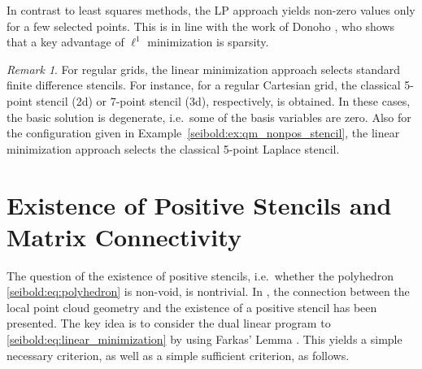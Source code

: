 \documentclass[reqno]{amsart}
\theoremstyle{plain}
\theoremstyle{definition}
\theoremstyle{remark}
\newtheorem{rem}{Remark}
\begin{document}
In contrast to least squares methods, the LP approach yields non-zero values only for
a few selected points. This is in line with the work of
Donoho \cite{Donoho2006_1,Donoho2006_2}, who shows that a key advantage of
$\ell^1$ minimization is sparsity.
\begin{rem}
For regular grids, the linear minimization approach selects standard finite difference
stencils. For instance, for a regular Cartesian grid, the classical 5-point stencil (2d)
or 7-point stencil (3d), respectively, is obtained. In these cases, the basic solution is
degenerate, i.e.~some of the basis variables are zero.
Also for the configuration given in Example~\ref{seibold:ex:qm_nonpos_stencil}, the
linear minimization approach selects the classical 5-point Laplace stencil.
\end{rem}

\section{Existence of Positive Stencils and Matrix Connectivity}
\label{seibold:sec:lp_solution_existence_connectivity}
The question of the existence of positive stencils, i.e.~whether the
polyhedron \eqref{seibold:eq:polyhedron} is non-void, is nontrivial.
In \cite{Seibold2008}, the connection between the local point cloud geometry and the
existence of a positive stencil has been presented. The key idea is to consider the
dual linear program to \eqref{seibold:eq:linear_minimization} by using
Farkas' Lemma \cite{Vanderbei2001}. This yields a simple necessary criterion, as well as
a simple sufficient criterion, as follows.
\end{document}
